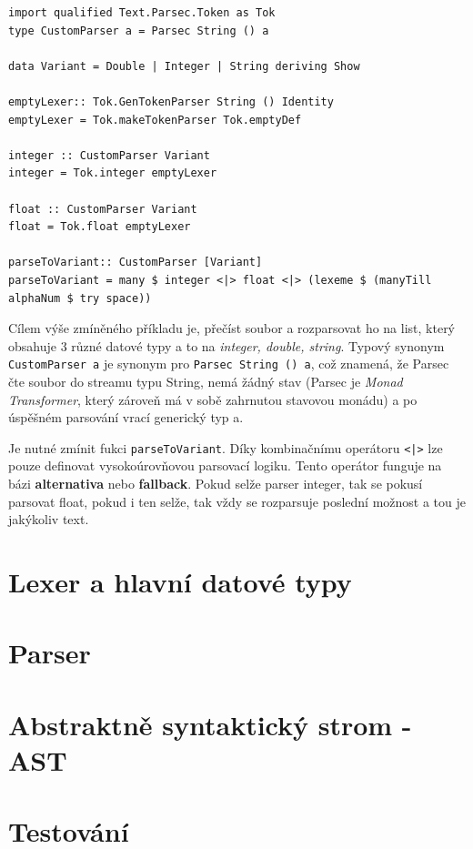 \documentclass[male,czech]{kithesis}
\newcommand{\haskellInline}[1]{\colorbox{gray!10}{\texttt{#1}}}
\begin{document}
\begin{verbatim}
import qualified Text.Parsec.Token as Tok
type CustomParser a = Parsec String () a

data Variant = Double | Integer | String deriving Show

emptyLexer:: Tok.GenTokenParser String () Identity
emptyLexer = Tok.makeTokenParser Tok.emptyDef

integer :: CustomParser Variant 
integer = Tok.integer emptyLexer 

float :: CustomParser Variant 
float = Tok.float emptyLexer 

parseToVariant:: CustomParser [Variant]
parseToVariant = many $ integer <|> float <|> (lexeme $ (manyTill alphaNum $ try space))
\end{verbatim}

Cílem výše zmíněného příkladu je, přečíst soubor a rozparsovat ho na list, 
který obsahuje 3 různé datové typy a to na \textit{integer, double, string}.
Typový synonym \haskellInline{CustomParser a} je synonym pro \haskellInline{Parsec String () a},
což znamená, že Parsec čte soubor do streamu typu String, nemá žádný stav (Parsec je \textit{Monad Transformer},
který zároveň má v sobě zahrnutou stavovou monádu) a po úspěšném parsování 
vrací generický typ a. 

Je nutné zmínit fukci \haskellInline{parseToVariant}. Díky kombinačnímu operátoru \haskellInline{<|>} 
lze pouze definovat vysokoúrovňovou parsovací logiku. Tento operátor funguje na bázi \textbf{alternativa} nebo
\textbf{fallback}. Pokud selže parser integer, tak se pokusí parsovat float, pokud i ten selže, tak vždy se 
rozparsuje poslední možnost a tou je jakýkoliv text.

\section{Lexer a hlavní datové typy}

\section{Parser}

\section{Abstraktně syntaktický strom - AST}

\section{Testování}
\end{document}
